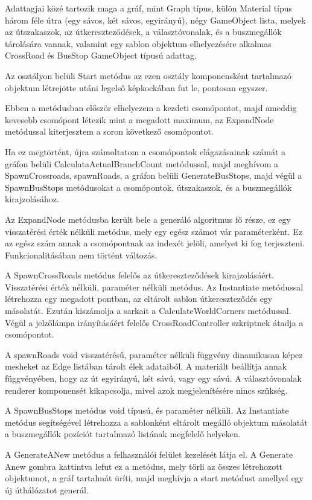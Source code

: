 Adattagjai közé tartozik maga a gráf, mint Graph típus, külön Material típus három féle útra (egy sávos, két sávos, egyirányú), négy GameObject lista, melyek az útszakaszok, az útkereszteződések, a választóvonalak, és a buszmegállók tárolására vannak, valamint egy sablon objektum elhelyezésére alkalmas CrossRoad és BusStop GameObject típusú adattag.

Az osztályon belüli Start metódus az ezen osztály komponensként tartalmazó objektum létrejötte utáni legelső képkockában fut le, pontosan egyszer.

Ebben a metódusban először elhelyezem a kezdeti csomópontot, majd ameddig kevesebb csomópont létezik mint a megadott maximum, az ExpandNode metódussal kiterjesztem a soron következő csomópontot.

Ha ez megtörtént, újra számoltatom a csomópontok elágazásainak számát a gráfon belüli CalculataActualBranchCount metódussal, majd meghívom a SpawnCrossroads, spawnRoads, a gráfon belüli GenerateBusStops, majd végül a SpawnBusStops metódusokat a csomópontok, útszakaszok, és a buszmegállók kirajzolásához.

Az ExpandNode metódusba került bele a generáló algoritmus fő része, ez egy visszatérési érték nélküli metódus, mely egy egész számot vár paraméterként. Ez az egész szám annak a csomópontnak az indexét jelöli, amelyet ki fog terjeszteni. Funkcionalitásában nem történt változás.

A SpawnCrossRoads metódus felelős az útkereszteződések kirajzolásáért. Visszatérési érték nélküli, paraméter nélküli metódus. Az Instantiate metódussal létrehozza egy megadott pontban, az eltárolt sablon útkereszteződés egy másolatát. Ezután kiszámolja a sarkait a CalculateWorldCorners metódussal. Végül a jelzőlámpa irányításáért felelős CrossRoadController szkriptnek átadja a csomópontot.

A spawnRoads void visszatérésű, paraméter nélküli függvény dinamikusan képez mesheket az Edge listában tárolt élek adataiból. A materiált beállítja annak függvényében, hogy az út egyirányú, két sávú, vagy egy sávú. A választóvonalak renderer komponensét kikapcsolja, mivel azok megjelenítésére nincs szükség. 

A SpawnBusStops metódus void típusú, és paraméter nélküli. Az Instantiate metódus segítségével létrehozza a sablonként eltárolt megálló objektum másolatát a buszmegállók pozíciót tartalmazó listának megfelelő helyeken.

A GenerateANew metódus a felhasználói felület kezelését látja el. A Generate Anew gombra kattintva lefut ez a metódus, mely törli az összes létrehozott objektumot, a gráf tartalmát üríti, majd meghívja a start metódust amellyel egy új úthálózatot generál.

